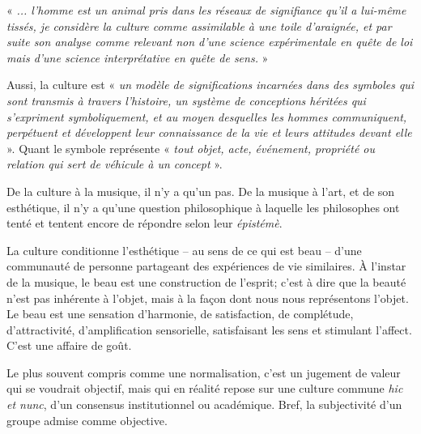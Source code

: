 \documentclass{article}
\begin{document}
 « \textit{... l’homme est un animal pris dans les réseaux de signifiance qu’il a lui-même tissés, je considère la culture comme assimilable à une toile d’araignée, et par suite son analyse comme relevant non d’une science expérimentale en quête de loi mais d’une science interprétative en quête de sens.} »

Aussi, la culture est « \textit{un modèle de significations incarnées dans des symboles qui sont transmis à travers l'histoire, un système de conceptions héritées qui s'expriment symboliquement, et au moyen desquelles les hommes communiquent, perpétuent et développent leur connaissance de la vie et leurs attitudes devant elle} ». Quant le symbole représente « \textit{tout objet, acte, événement, propriété ou relation qui sert de véhicule à un concept} ».

%

\bigskip

De la culture à la musique, il n'y a qu'un pas. De la musique à l'art, et de son esthétique, il n'y a qu'une question philosophique à laquelle les philosophes  ont tenté et tentent encore de répondre selon leur \textit{épistémè}.

La culture conditionne l'esthétique -- au sens de ce qui est beau -- d'une communauté de personne partageant des expériences de vie similaires. 
À l'instar de la musique, le beau est une construction de l'esprit; c'est à dire que la beauté n'est pas inhérente à l'objet, mais à la façon dont nous nous représentons l'objet. Le beau est une sensation d'harmonie, de satisfaction, de complétude, d'attractivité, d'amplification sensorielle, satisfaisant les sens et stimulant l'affect. C'est une affaire de goût.

Le plus souvent compris comme une normalisation, c'est un jugement de valeur qui se voudrait objectif, mais qui en réalité repose sur une culture commune \textit{hic et nunc}, d'un consensus institutionnel ou académique. Bref, la subjectivité d'un groupe admise comme objective.
\end{document}
